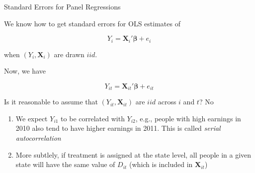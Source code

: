 \documentclass[11pt,english,handout]{beamer}
\newenvironment{wideitemize}{\itemize\addtolength{\itemsep}{10pt}}{\enditemize}
\begin{document}
\begin{frame}{Standard Errors for Panel Regressions}
\begin{wideitemize}
	\item
	We know how to get standard errors for OLS estimates of 
	
	$$Y_i = \bm{X}_i'\bm{\beta} + e_i$$
	
	\noindent when $(Y_i,\bm{X}_i)$ are drawn $iid$.
	
	\pause
	\item
	Now, we have 
	
		$$Y_{it} = \bm{X}_{it}'\bm{\beta} + e_{it}$$
		
	\pause
	\item
	Is it reasonable to assume that $(Y_{it}, \bm{X}_{it})$ are $iid$ across $i$ and $t$? \pause{} No
	
	\pause
	\begin{enumerate}
		\item 
		We expect $Y_{i1}$ to be correlated with $Y_{i2}$, e.g., people with high earnings in 2010 also tend to have higher earnings in 2011. This is called \emph{serial autocorrelation} 
		
		\pause
		\item
		More subtlely, if treatment is assigned at the state level, all people in a given state will have the same value of $D_{it}$ (which is included in $\bm{X}_{it}$)
	\end{enumerate}


\end{wideitemize}
\end{frame}
\end{document}

